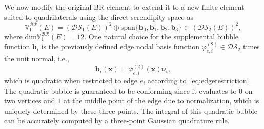 We now modify the original BR element to extend it to a new finite element suited to quadrilaterals using the direct serendipity space as 
\begin{equation}\label{eq:br}
		  \mathbb{V}_1^{\mathcal{BR}}(E) = (\mathcal{DS}_1(E))^2 \oplus \text{span}\{\mathbf{b}_0, \mathbf{b}_1, \mathbf{b}_2, \mathbf{b}_3\} \subset (\mathcal{DS}_2(E))^2,
\end{equation}
where $\text{dim} \mathbb{V}_1^{\mathcal{BR}}(E) = 12.$
One natural choice for the supplemental bubble function $\mathbf{b}_i$ is the previously defined 
edge nodal basis function $\varphi^{(2)}_{e,i} \in \mathcal{DS}_2$ times the unit normal, i.e., 
\begin{equation}\label{eq:bubble}
		  \mathbf{b}_i(\mathbf{x}) = \varphi^{(2)}_{e,i}(\mathbf{x})\pmb{\nu}_i, 
\end{equation}
which is quadratic when restricted to edge $e_i$ according to~\eqref{eq:edgerestriction}. 
The quadratic bubble is guaranteed to be conforming since it evaluates to $0$ on two vertices and $1$ at 
the middle point of the edge due to normalization, which is uniquely 
determined by these three points. The integral of this quadratic bubble can be
accurately computed by a three-point Gaussian quadrature rule.


